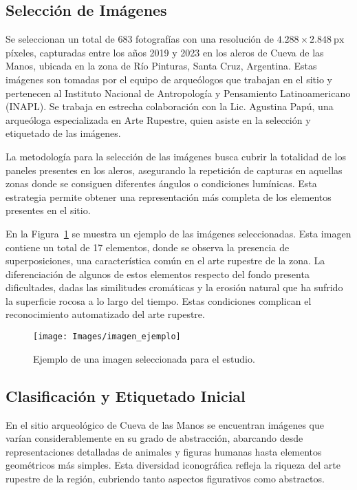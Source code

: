 \subsection{Selección de Imágenes}
Se seleccionan un total de 683 fotografías con una resolución de \(4.288 \times 2.848\ \text{px}\) píxeles, capturadas entre los años 2019 y 2023 en los aleros de Cueva de las Manos, ubicada en la zona de Río Pinturas, Santa Cruz, Argentina.
Estas imágenes son tomadas por el equipo de arqueólogos que trabajan en el sitio y pertenecen al Instituto Nacional de Antropología y Pensamiento Latinoamericano (INAPL).
Se trabaja en estrecha colaboración con la Lic. Agustina Papú, una arqueóloga especializada en Arte Rupestre, quien asiste en la selección y etiquetado de las imágenes.

La metodología para la selección de las imágenes busca cubrir la totalidad de los paneles presentes en los aleros, asegurando la repetición de capturas en aquellas zonas donde se consiguen diferentes ángulos o condiciones lumínicas.
Esta estrategia permite obtener una representación más completa de los elementos presentes en el sitio.

En la Figura~\ref{fig:imagen_ejemplo} se muestra un ejemplo de las imágenes seleccionadas. Esta imagen contiene un total de 17 elementos, donde se observa la presencia de superposiciones, una característica común en el arte rupestre de la zona.
La diferenciación de algunos de estos elementos respecto del fondo presenta dificultades, dadas las similitudes cromáticas y la erosión natural que ha sufrido la superficie rocosa a lo largo del tiempo.
Estas condiciones complican el reconocimiento automatizado del arte rupestre.

\begin{figure}[!h]
    \centering
    \texttt{[image: Images/imagen\_ejemplo]}
    \caption{Ejemplo de una imagen seleccionada para el estudio.}
    \label{fig:imagen_ejemplo}
\end{figure}

\subsection{Clasificación y Etiquetado Inicial}

En el sitio arqueológico de Cueva de las Manos se encuentran imágenes que varían considerablemente en su grado de abstracción, abarcando desde representaciones detalladas de animales y figuras humanas hasta elementos geométricos más simples.
Esta diversidad iconográfica refleja la riqueza del arte rupestre de la región, cubriendo tanto aspectos figurativos como abstractos.

